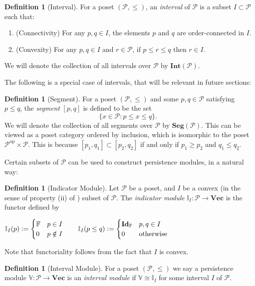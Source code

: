 \documentclass[a4paper,UKenglish,thm-restate]{article}
\theoremstyle{definition}
\newtheorem{definition}[theorem]{Definition}
\def\bbv{\mathbb{V}}
\def\bvec{\mathbf{Vec}}
\newcommand{\defeq}{\vcentcolon=}
\begin{document}
    \begin{definition}[Interval] \label{def:interval}
        For a poset $(\mathcal{P}, \leq)$, an \emph{interval} of $\mathcal{P}$ is a subset $I \subset \mathcal{P}$ such that:
        \begin{enumerate}
            \item[(i)]{(Connectivity)} For any $p, q \in I$, the elements $p$ and $q$ are order-connected in $I$.
            \item[(ii)]{(Convexity)} For any $p, q \in I$ and $r \in \mathcal{P}$, if $p \leq r \leq q$ then $r \in I$.
        \end{enumerate}
        We will denote the collection of all intervals over $\mathcal{P}$ by $\mathbf{Int}(\mathcal{P})$.
    \end{definition}

    The following is a special case of intervals, that will be relevant in future sections:
    \begin{definition}[Segment] \label{def:segment}
        For a poset $(\mathcal{P}, \leq)$ and some $p, q \in \mathcal{P}$ satisfying $p \leq q$, the \emph{segment} $[p, q]$ is defined to be the set \[\{ x \in \mathcal{P} : p \leq x \leq q \}.\]
        We will denote the collection of all segments over $\mathcal{P}$ by $\mathbf{Seg}(\mathcal{P})$. This can be viewed as a poset category ordered by inclusion, which is isomorphic to the poset $\mathcal{P}^\text{op}\times\mathcal{P}$. This is because $[p_1, q_1] \subset [p_2, q_2]$ if and only if $p_1 \geq p_2$ and $q_1 \leq q_2$.
    \end{definition}

    Certain subsets of $\mathcal{P}$ can be used to construct persistence modules, in a natural way:
    \begin{definition}[Indicator Module]
        Let $\mathcal{P}$ be a poset, and $I$ be a convex (in the sense of property (ii) of ) subset of $\mathcal{P}$. The \emph{indicator module} $\mathbb{I}_I: \mathcal{P} \rightarrow \bvec$ is the functor defined by
        \begin{center}
            $\mathbb{I}_I(p) \defeq \begin{cases} \mathbb{F} & p \in I\\ 0 & p \notin I \end{cases}
            \qquad
            \mathbb{I}_I(p \leq q) \defeq \begin{cases} \mathbf{Id}_\mathbb{F} & p, q \in I\\ 0 & \mathrm{otherwise} \end{cases}
            $
        \end{center}
        Note that functoriality follows from the fact that $I$ is convex.
    \end{definition}
    \begin{definition}[Interval Module] \label{def:intervalmodule}
        For a poset $(\mathcal{P}, \leq)$ we say a persistence module $\bbv: \mathcal{P} \rightarrow \bvec$ is an \emph{interval module} if $\bbv \cong \mathbb{I}_I$ for some interval $I$ of $\mathcal{P}$.
    \end{definition}
    
\end{document}
